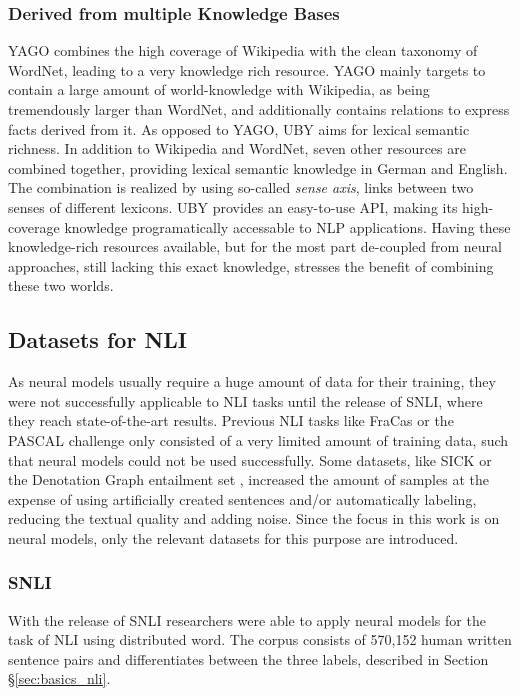 \subsubsection{Derived from multiple Knowledge Bases}
\ac{YAGO} \citep{suchanek2007yago} combines the high coverage of Wikipedia with the clean taxonomy of WordNet, leading to a very knowledge rich resource. \ac{YAGO} mainly targets to contain a large amount of world-knowledge with Wikipedia, as being tremendously larger than WordNet, and additionally contains relations to express facts derived from it. As opposed to \ac{YAGO}, UBY \citep{gurevych2012uby} aims for lexical semantic richness. In addition to Wikipedia and WordNet, seven other resources are combined together, providing lexical semantic knowledge in German and English. The combination is realized by using so-called \textit{sense axis}, links between two senses of different lexicons. UBY provides an easy-to-use API, making its high-coverage knowledge programatically accessable to \ac{NLP} applications. Having these knowledge-rich resources available, but for the most part de-coupled from neural approaches, still lacking this exact knowledge, stresses the benefit of combining these two worlds. 

\subsection{Datasets for NLI}\label{sec:basics_datasets}
As neural models usually require a huge amount of data for their training, they were not successfully applicable to \ac{NLI} tasks until the release of \ac{SNLI}, where they reach state-of-the-art results. Previous \ac{NLI} tasks like FraCas \citep{cooper1996using} or the PASCAL challenge \citep{dagan2006pascal} only consisted of a very limited amount of training data, such that neural models could not be used successfully. Some datasets, like \ac{SICK} \citep{marelli2014semeval} or the Denotation Graph entailment set \citep{young2014image}, increased the amount of samples at the expense of using artificially created sentences and/or automatically labeling, reducing the textual quality and adding noise. Since the focus in this work is on neural models, only the relevant datasets for this purpose are introduced.
\subsubsection{SNLI}\label{sec:snli}
With the release of \ac{SNLI} \citep{bowman2015large} researchers were able to apply neural models for the task of \ac{NLI} using distributed word. The corpus consists of 570,152 human written sentence pairs and differentiates between the three labels, described in Section §\ref{sec:basics_nli}. 
